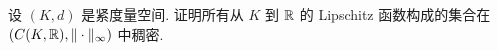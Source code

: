 

\begin{exercise}[9]
    设 $(K,d)$ 是紧度量空间. 证明所有从 $K$ 到 $\mathbb{R}$ 的 Lipschitz 函数构成的集合在 $(C(K,\mathbb{R}),\|\cdot\|_{\infty})$ 中稠密.
\end{exercise}


